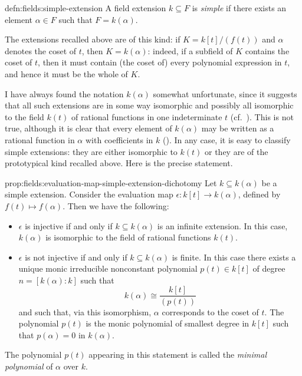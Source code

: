 \begin{defn}{}{defn:fields:simple-extension}
  A field extension $k \subseteq F$ is \emph{simple} if there exists
  an element $\alpha \in F$ such that $F = k(\alpha)$.
\end{defn}
The extensions recalled above are of this kind: if $K = k[t]/(f(t))$
and $\alpha$ denotes the coset of $t$, then $K = k(\alpha)$: indeed,
if a subfield of $K$ contains the coset of $t$, then it must contain
(the coset of) every polynomial expression in $t$, and hence it must
be the whole of $K$.

I have always found the notation $k(\alpha)$ somewhat unfortunate,
since it suggests that all such extensions are in some way isomorphic
and possibly all isomorphic to the field $k(t)$ of rational functions
in one indeterminate $t$ (cf.\ ). This is not
true, although it is clear that every element of $k(\alpha)$ may be
written as a rational function in $\alpha$ with coefficients in $k$
().  In any case,
it is easy to classify simple extensions: they are either isomorphic
to $k(t)$ or they are of the prototypical kind recalled above.  Here
is the precise statement.

\begin{prop}{}{prop:fields:evaluation-map-simple-extension-dichotomy}
  Let $k \subseteq k(\alpha)$ be a simple extension. Consider the
  evaluation map $\epsilon : k[t] \to k(\alpha)$, defined by
  $f(t) \mapsto f(\alpha)$.  Then we have the following:
  \begin{itemize}
  \item $\epsilon$ is injective if and only if $k \subseteq k(\alpha)$
    is an infinite extension. In this case, $k(\alpha)$ is isomorphic
    to the field of rational functions $k(t)$.
  \item $\epsilon$ is not injective if and only if
    $k \subseteq k(\alpha)$ is finite. In this case there exists a
    unique monic irreducible nonconstant polynomial $p(t) \in k[t]$ of
    degree $n = [k(\alpha) : k]$ such that
    \[k(\alpha) \cong \frac{k[t]}{(p(t))}\] and such that, via this
    isomorphism, $\alpha$ corresponds to the coset of $t$. The polynomial $p(t)$ is
    the monic polynomial of smallest degree in $k[t]$ such that
    $p(\alpha) = 0$ in $k(\alpha)$.
  \end{itemize}
\end{prop}
The polynomial $p(t)$ appearing in this statement is called the
\emph{minimal polynomial} of $\alpha$ over $k$.

